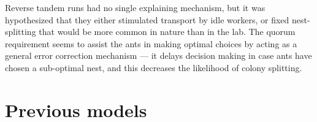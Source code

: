 \documentclass[letterpaper]{article}
\makeatletter
\def\mcolor#1#{\@mcolor{#1}}
\def\@mcolor#1#2#3{%
  \protect\leavevmode
  \begingroup
    \color#1{#2}#3%
  \endgroup
}
\newcommand{\sitem}[1]
{
    \begin{itemize}
        \item #1
    \end{itemize}
}
\makeatother
\begin{document}

Reverse tandem runs had no single explaining mechanism, but it was hypothesized that they either stimulated transport by idle workers, or fixed nest-splitting that would be more common in nature than in the lab.
The quorum requirement seems to assist the ants in making optimal choices by acting as a general error correction mechanism --- it delays decision making in case ants have chosen a sub-optimal nest, and this decreases the likelihood of colony splitting.


\section{Previous models}
\end{document}
